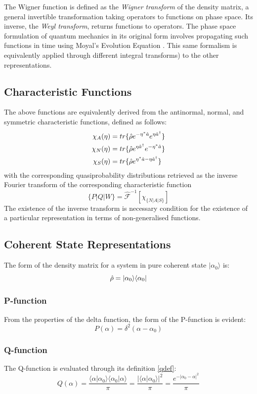 The Wigner function is defined as the \emph{Wigner transform} of the density matrix, a general invertible transformation taking operators to functions on phase space. Its inverse, the \emph{Weyl transform}, returns functions to operators. The phase space formulation of quantum mechanics in its original form involves propagating such functions in time using Moyal's Evolution Equation \autocite{Curtright2011}. This same formalism is equivalently applied  through different integral transforms) to the other representations.
\subsection{Characteristic Functions}
The above functions are equivalently derived from the antinormal, normal, and symmetric characteristic functions, defined as follows:
\begin{align}
	\chi_{A} (\eta) &= tr\{\hat{\rho} e^{-\eta^* \hat{a}}e^{\eta \hat{a}^\dagger } \} \\
	\chi_{N} (\eta) &= tr\{\hat{\rho} e^{\eta \hat{a}^\dagger}e^{-\eta^* \hat{a} } \} \\
	\chi_{S} (\eta) &= tr\{\hat{\rho} e^{\eta^* \hat{a}-\eta \hat{a}^\dagger } \} 
\end{align}
with the corresponding quasiprobability distributions retrieved as the inverse Fourier transform of the corresponding characteristic function
 \begin{equation}
 	\{P|Q|W\} = \hat{\mathscr{F}}^{-1} [\chi_{\{N|A|S\}}]
\end{equation}
The existence of the inverse transform is necessary condition for the existence of a particular representation in terms of non-generalised functions. 
\subsection{Coherent State Representations}
The form of the density matrix for a system in pure coherent state $ | \alpha_0 \rangle $  is:
\begin{equation}
 	\hat{\rho} = | \alpha_0 \rangle \langle \alpha_0 | 
 \end{equation}
 \subsubsection{P-function}
 From the properties of the delta function, the form of the P-function is evident:
\begin{equation}
	P(\alpha) = \delta^2(\alpha-\alpha_0)
\end{equation}
\subsubsection{Q-function}
The Q-function is evaluated through its definition \ref{qdef}:
\begin{equation}
	Q(\alpha) = \frac{\langle \alpha | \alpha_0 \rangle \langle \alpha_0 | \alpha \rangle}{\pi} = \frac{{|\langle \alpha | \alpha_0 \rangle |}^2}{\pi} =  \frac{e^{-{|\alpha_0 - \alpha |}^2}}{\pi}
\end{equation}

